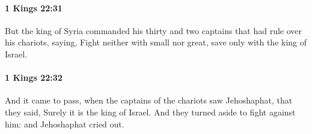 		\paragraph{1 Kings 22:31} %
			\label{1KINGS-22-31}

			But the king of Syria commanded his thirty and two captains that had rule over his chariots, saying, Fight neither with small nor great, save only with the king of Israel.


		\paragraph{1 Kings 22:32} %
			\label{1KINGS-22-32}

			And it came to pass, when the captains of the chariots saw Jehoshaphat, that they said, Surely it is the king of Israel. And they turned aside to fight against him: and Jehoshaphat cried out.


